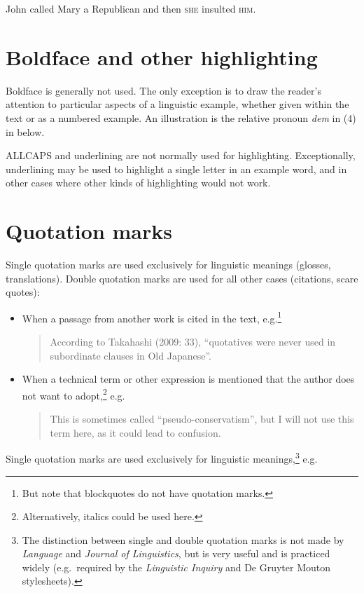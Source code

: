 \documentclass[a4paper]{article}
\newenvironment{gsrexq}{\begin{quote}\color{blue}}{\end{quote}}
\newcommand{\eagsr}{\bgroup\color{blue}\ea}
\newcommand{\zgsr}{\z\egroup}
\begin{document}
\eagsr
  John called Mary a Republican and then \textsc{she} insulted \textsc{him}.
\zgsr

\section{Boldface and other
highlighting}\label{sec:boldface-and-other-highlighting}

Boldface is generally not used. The only exception is to draw the
reader's attention to particular aspects of a linguistic example,
whether given within the text or as a numbered example. An illustration
is the relative pronoun \textit{dem} in (4) in  below. 

ALLCAPS and
underlining are not normally used for highlighting. Exceptionally,
underlining may be used to highlight a single letter in an example word,
and in other cases where other kinds of highlighting would not work.

\section{Quotation marks}\label{sec:quotation-marks}

Single quotation marks are used exclusively for linguistic meanings
(glosses, translations). Double quotation marks are used for all other
cases (citations, scare quotes):

\begin{itemize}
\item  When a passage from another work is cited in the text, e.g.\footnote{But note that blockquotes do not have quotation marks.}
    \begin{gsrexq} 
      According to Takahashi (2009: 33), ``quotatives were never used in subordinate clauses in Old Japanese''.
    \end{gsrexq}
\item When a technical term or other expression is mentioned that the author does not want to adopt,\footnote{Alternatively, italics could be used here.} e.g.
    \begin{gsrexq}
      This is sometimes called ``pseudo-conservatism'', but I will not use this term here, as it could lead to confusion.
    \end{gsrexq}
\end{itemize}

Single quotation marks are used exclusively for
linguistic meanings,\footnote{The distinction between single and double
quotation marks is not made by \textit{Language} and \textit{Journal of Linguistics}, but
is very useful and is practiced widely (e.g.~required by the \textit{Linguistic
Inquiry} and De Gruyter Mouton stylesheets).} e.g.
\end{document}
